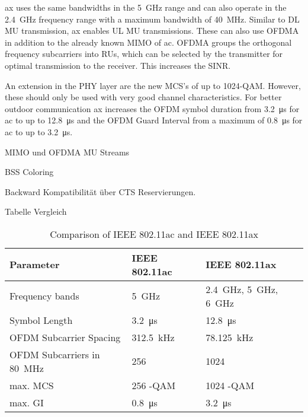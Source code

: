 \ac{ax} uses the same bandwidths in the \SI{5}{\giga\hertz} range and can also operate in the \SI{2.4}{\giga\hertz} frequency range with a maximum bandwidth of \SI{40}{\mega\hertz}. Similar to DL MU transmission, \ac{ax} enables UL MU transmissions. These can also use \ac{OFDMA} in addition to the already known \ac{MIMO} of \ac{ac}. \ac{OFDMA} groups the orthogonal frequency subcarriers into \ac{RU}s, which can be selected by the transmitter for optimal transmission to the receiver. This increases the \ac{SINR}.

An extension in the PHY layer are the new \ac{MCS}'s of up to 1024-\ac{QAM}. However, these should only be used with very good channel characteristics.
 For better outdoor communication \ac{ax} increases the \ac{OFDM} symbol duration from \SI{3.2}{\micro\second} for \ac{ac} to up to \SI{12.8}{\micro\second} and the \ac{OFDM} Guard Interval from a maximum of \SI{0.8}{\micro\second} for \ac{ac} to up to \SI{3.2}{\micro\second}.   
 
MIMO und OFDMA MU Streams

BSS Coloring

Backward Kompatibilität über CTS Reservierungen.

Tabelle Vergleich

\begin{table}
	\centering
	\begin{tabular}{>{\raggedright}p{1.7cm}p{5.4cm}p{3.4cm}}
		\toprule
		Parameter & IEEE 802.11ac & IEEE 802.11ax \\
		\midrule
		Frequency bands & \SI{5}{\giga\hertz}&
		\SI{2.4}{\giga\hertz}, \SI{5}{\giga\hertz}, \SI{6}{\giga\hertz}\\
		Symbol Length & \SI{3.2}{\micro\second}&
		\SI{12.8}{\micro\second}\\
		\ac{OFDM} Subcarrier Spacing &
		\SI{312.5}{\kilo\hertz} &
		\SI{78.125}{\kilo\hertz} \\
		\ac{OFDM} Subcarriers in \SI{80}{\mega\hertz} &
		256 &
		1024 \\
		max. \ac{MCS} &
		256 -\ac{QAM} &
		1024 -\ac{QAM} \\
		max. \ac{GI} &
		\SI{0.8}{\micro\second} &
		\SI{3.2}{\micro\second} \\
		\bottomrule
	\end{tabular}
	\caption{Comparison of IEEE 802.11ac and IEEE 802.11ax}
	\label{tab:SensorNetworkApplications}
\end{table}